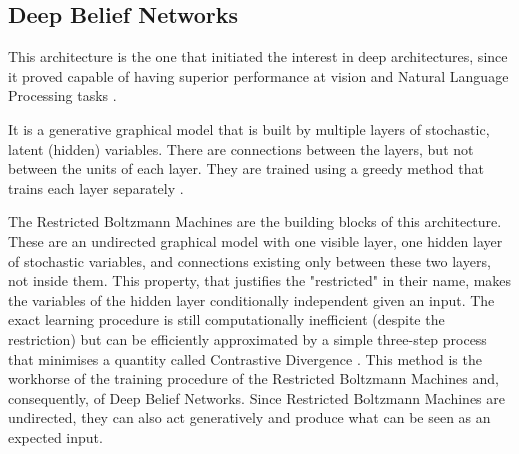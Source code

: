 \documentclass[a4paper]{article}
\begin{document}
		
		\subsection{Deep Belief Networks}
		\label{sec:DBN}		
			This architecture is the one that initiated the interest in deep architectures, since it proved capable of having superior performance at vision and Natural Language Processing tasks \cite{Hinton2006,Hinton2006a}. 

			It is a generative graphical model that is built by multiple layers of stochastic, latent (hidden) variables. There are connections between the layers, but not between the units of each layer. They are trained using a greedy method that trains each layer separately \cite{Hinton2006a}. 
			
			The Restricted Boltzmann Machines are the building blocks of this architecture. These are an undirected graphical model with one visible layer, one hidden layer of stochastic variables, and connections existing only between these two layers, not inside them. This property, that justifies the "restricted" in their name, makes the variables of the hidden layer conditionally independent given an input. The exact learning procedure is still computationally inefficient (despite the restriction) but can be efficiently approximated by a simple three-step process that minimises a quantity called Contrastive Divergence \cite{Hinton2002}. This method is the workhorse of the training procedure of the Restricted Boltzmann Machines and, consequently, of Deep Belief Networks. Since Restricted Boltzmann Machines are undirected, they	 can also act generatively and produce what can be seen as an expected input.
			
\end{document}
